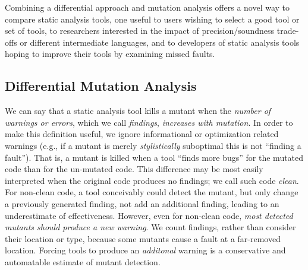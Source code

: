 Combining a differential approach and mutation analysis offers a novel way to compare static analysis tools, one useful to users wishing to select a good tool or set of tools, to researchers interested in the impact of precision/soundness trade-offs or different intermediate languages, and to developers of static analysis tools hoping to improve their tools by examining missed faults.

\subsection{Differential Mutation Analysis}

We can say that a static analysis tool kills a mutant when the \emph{number of warnings or errors}, which we call \emph{findings}, \emph{increases with mutation}.  In order to make this definition useful, we ignore informational or optimization related warnings (e.g., if a mutant is merely \emph{stylistically} suboptimal this is not ``finding a fault''). That is, a mutant is killed when a tool ``finds more bugs'' for the mutated code than for the un-mutated code.  This difference may be most easily interpreted when the original code produces no findings; we call such code \emph{clean}. For non-clean code, a tool conceivably could detect the mutant, but only change a previously generated finding, not add an additional finding, leading to an underestimate of effectiveness.  However, even for non-clean code, \emph{most detected mutants should produce a new warning}.  We count findings, rather than consider their location or type, because some mutants cause a fault at a far-removed location.  Forcing tools to produce an \emph{additonal} warning is a conservative and automatable estimate of mutant detection.

